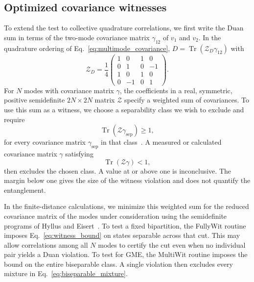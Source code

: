 \documentclass[%
 reprint,
 amsmath,amssymb,
 aps,
pra,
twocolumn,
]{revtex4-2}
\begin{document}
\subsection{Optimized covariance witnesses}
\label{sec:covariance_witnesses}

To extend the test to collective quadrature correlations, we first write the Duan sum in terms of the two-mode covariance matrix $\gamma_{12}$ of $v_1$ and $v_2$. In the quadrature ordering of Eq.~\eqref{eq:multimode_covariance}, $D=\operatorname{Tr}(\mathcal Z_D\gamma_{12})$ with
\begin{equation}
    \mathcal Z_D=\frac14\begin{pmatrix}
        1&0&1&0\\
        0&1&0&-1\\
        1&0&1&0\\
        0&-1&0&1
    \end{pmatrix}.
    \label{eq:duan_witness}
\end{equation}
For $N$ modes with covariance matrix $\gamma$, the coefficients in a real, symmetric, positive semidefinite $2N\times 2N$ matrix $\mathcal Z$ specify a weighted sum of covariances. To use this sum as a witness, we choose a separability class we wish to exclude and require
\begin{equation}
    \operatorname{Tr}(\mathcal Z\gamma_{\mathrm{sep}})\ge1,
    \label{eq:witness_bound}
\end{equation}
for every covariance matrix $\gamma_{\mathrm{sep}}$ in that class~\cite{hyllus2006optimal}. A measured or calculated covariance matrix $\gamma$ satisfying
\begin{equation}
    \operatorname{Tr}(\mathcal Z\gamma)<1,
    \label{eq:witness_violation}
\end{equation}
then excludes the chosen class. A value at or above one is inconclusive. The margin below one gives the size of the witness violation and does not quantify the entanglement.

In the finite-distance calculations, we minimize this weighted sum for the reduced covariance matrix of the modes under consideration using the semidefinite programs of Hyllus and Eisert~\cite{hyllus2006optimal}. To test a fixed bipartition, the FullyWit routine imposes Eq.~\eqref{eq:witness_bound} on states separable across that cut. This may allow correlations among all $N$ modes to certify the cut even when no individual pair yields a Duan violation. To test for GME, the MultiWit routine imposes the bound on the entire biseparable class. A single violation then excludes every mixture in Eq.~\eqref{eq:biseparable_mixture}.
\end{document}
